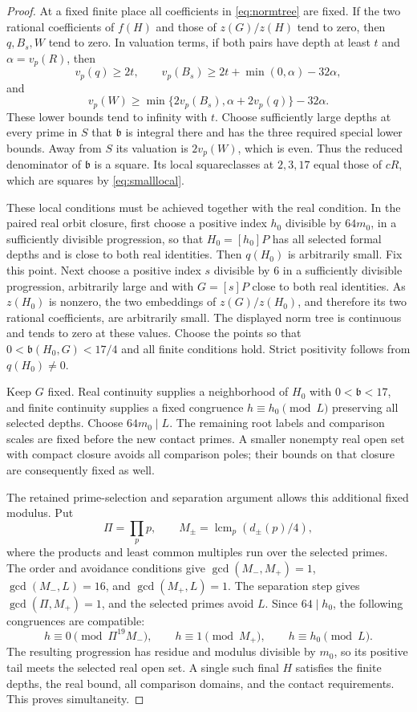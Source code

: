 \documentclass[11pt,a4paper]{article}
\theoremstyle{definition}\newtheorem{definition}[theorem]{Definition}
\theoremstyle{remark}\newtheorem{remark}[theorem]{Remark}
\begin{document}
\begin{proof}
At a fixed finite place all coefficients in \eqref{eq:normtree} are
fixed. If the two rational coefficients of $f(H)$ and those of
$z(G)/z(H)$ tend to zero, then $q,B_s,W$ tend to zero. In valuation
terms, if both pairs have depth at least $t$ and $\alpha=v_p(R)$,
then
\[
 v_p(q)\ge2t,\qquad
 v_p(B_s)\ge2t+\min(0,\alpha)-32\alpha,
\]
and
\[
 v_p(W)\ge
 \min\{2v_p(B_s),\alpha+2v_p(q)\}-32\alpha.
\]
These lower bounds tend to infinity with $t$. Choose sufficiently
large depths at every prime in $S$ that $\mathfrak b$ is integral
there and has the three required special lower bounds. Away from
$S$ its valuation is $2v_p(W)$, which is even. Thus the reduced
denominator of $\mathfrak b$ is a square. Its local squareclasses
at $2,3,17$ equal those of $cR$, which are squares by
\eqref{eq:smalllocal}.

These local conditions must be achieved together with the real
condition. In the paired real orbit closure, first choose a positive
index $h_0$ divisible by $64m_0$, in a sufficiently divisible
progression, so that
$H_0=[h_0]P$ has all selected formal depths and is close to both real
identities. Then $q(H_0)$ is arbitrarily small. Fix this point.
Next choose a positive index $s$ divisible by $6$ in a sufficiently
divisible progression, arbitrarily large and with $G=[s]P$ close to both real
identities. As $z(H_0)$ is nonzero, the two embeddings of
$z(G)/z(H_0)$, and therefore its two rational coefficients, are
arbitrarily small. The displayed norm tree is continuous and tends
to zero at these values. Choose the points so that
$0<\mathfrak b(H_0,G)<17/4$ and all finite conditions hold.
Strict positivity follows from $q(H_0)\ne0$.

Keep $G$ fixed. Real continuity supplies a neighborhood of $H_0$
with $0<\mathfrak b<17$, and finite continuity supplies a fixed
congruence $h\equiv h_0\pmod L$ preserving all selected depths.
Choose $64m_0\mid L$. The remaining root labels and comparison
scales are fixed before the new contact primes. A smaller nonempty
real open set with compact closure avoids all comparison poles;
their bounds on that closure are consequently fixed as well.

The retained prime-selection and separation argument allows this
additional fixed modulus. Put
\[
 \Pi=\prod_p p,\qquad
 M_\pm=\operatorname{lcm}_p(d_\pm(p)/4),
\]
where the products and least common multiples run over the selected
primes. The order and avoidance conditions give
$\gcd(M_-,M_+)=1$, $\gcd(M_-,L)=16$, and
$\gcd(M_+,L)=1$. The separation step gives
$\gcd(\Pi,M_+)=1$, and the selected primes avoid $L$.
Since $64\mid h_0$, the following congruences are compatible:
\[
 h\equiv0\pmod{\Pi^{19}M_-},\qquad
 h\equiv1\pmod{M_+},\qquad h\equiv h_0\pmod L.
\]
The resulting progression has residue and modulus divisible by $m_0$,
so its positive tail meets the selected real open set. A single such
final $H$ satisfies the finite depths, the real bound, all comparison
domains, and the contact requirements. This proves simultaneity.
\end{proof}
\end{document}
